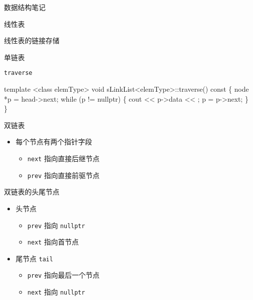 \documentclass[
  ignorenonframetext,
]{beamer}
\newenvironment{Shaded}{}{}
\newcommand{\NormalTok}[1]{#1}
\providecommand{\tightlist}{%
  \setlength{\itemsep}{0pt}\setlength{\parskip}{0pt}}
\begin{document}
\begin{frame}[fragile]{数据结构笔记}
\begin{block}{线性表}
\begin{block}{线性表的链接存储}
\begin{block}{单链表}
\begin{block}{\texttt{traverse}}
\protect{}\label{traverse-1}
\begin{Shaded}
\begin{Highlighting}[]
\NormalTok{template \textless{}class elemType\textgreater{}}
\NormalTok{void sLinkList\textless{}elemType\textgreater{}::traverse() const}
\NormalTok{\{}
\NormalTok{  node *p = head{-}\textgreater{}next;}
\NormalTok{  while (p != nullptr)}
\NormalTok{  \{}
\NormalTok{    cout \textless{}\textless{} p{-}\textgreater{}data \textless{}\textless{} \textquotesingle{} \textquotesingle{};}
\NormalTok{    p = p{-}\textgreater{}next;}
\NormalTok{  \}}
\NormalTok{\}}
\end{Highlighting}
\end{Shaded}
\end{block}
\end{block}

\begin{block}{双链表}
\protect{}\label{ux53ccux94feux8868}
\begin{itemize}
\tightlist
\item
  每个节点有两个指针字段

  \begin{itemize}
  \tightlist
  \item
    \texttt{next} 指向直接后继节点
  \item
    \texttt{prev} 指向直接前驱节点
  \end{itemize}
\end{itemize}

\begin{block}{双链表的头尾节点}
\protect{}\label{ux53ccux94feux8868ux7684ux5934ux5c3eux8282ux70b9}
\begin{itemize}
\tightlist
\item
  头节点

  \begin{itemize}
  \tightlist
  \item
    \texttt{prev} 指向 \texttt{nullptr}
  \item
    \texttt{next} 指向首节点
  \end{itemize}
\item
  尾节点 \texttt{tail}

  \begin{itemize}
  \tightlist
  \item
    \texttt{prev} 指向最后一个节点
  \item
    \texttt{next} 指向 \texttt{nullptr}
  \end{itemize}
\end{itemize}


\end{block}
\end{block}
\end{block}
\end{block}
\end{frame}
\end{document}
